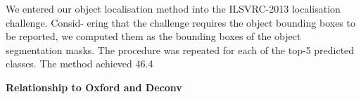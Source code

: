 We entered our object localisation method into the ILSVRC-2013 localisation challenge. Consid- ering that the challenge requires the object bounding boxes to be reported, we computed them as the bounding boxes of the object segmentation masks. The procedure was repeated for each of the top-5 predicted classes. The method achieved 46.4%

\textbf{Relationship to Oxford and Deconv}
